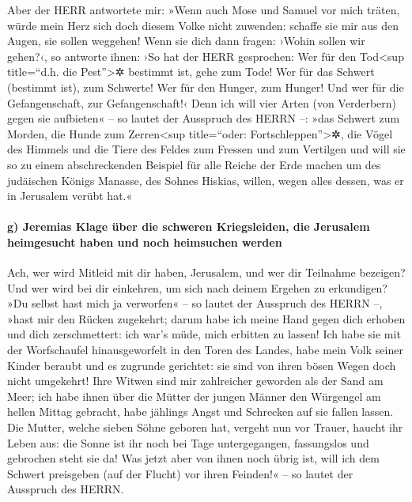 Aber der HERR antwortete mir: »Wenn auch Mose und Samuel
vor mich träten, würde mein Herz sich doch diesem Volke nicht zuwenden:
schaffe sie mir aus den Augen, sie sollen weggehen! Wenn
sie dich dann fragen: ›Wohin sollen wir gehen?‹, so antworte ihnen: ›So
hat der HERR gesprochen: Wer für den Tod\textless sup title=``d.h. die
Pest''\textgreater✲ bestimmt ist, gehe zum Tode! Wer für das Schwert
(bestimmt ist), zum Schwerte! Wer für den Hunger, zum Hunger! Und wer
für die Gefangenschaft, zur Gefangenschaft!‹ Denn ich will
vier Arten (von Verderbern) gegen sie aufbieten« -- so lautet der
Ausspruch des HERRN --: »das Schwert zum Morden, die Hunde zum
Zerren\textless sup title=``oder: Fortschleppen''\textgreater✲, die
Vögel des Himmels und die Tiere des Feldes zum Fressen und zum Vertilgen
und will sie so zu einem abschreckenden Beispiel für alle
Reiche der Erde machen um des judäischen Königs Manasse, des Sohnes
Hiskias, willen, wegen alles dessen, was er in Jerusalem verübt hat.«

\hypertarget{g-jeremias-klage-uxfcber-die-schweren-kriegsleiden-die-jerusalem-heimgesucht-haben-und-noch-heimsuchen-werden}{%
\paragraph{g) Jeremias Klage über die schweren Kriegsleiden, die
Jerusalem heimgesucht haben und noch heimsuchen
werden}\label{g-jeremias-klage-uxfcber-die-schweren-kriegsleiden-die-jerusalem-heimgesucht-haben-und-noch-heimsuchen-werden}}

Ach, wer wird Mitleid mit dir haben, Jerusalem, und wer
dir Teilnahme bezeigen? Und wer wird bei dir einkehren, um sich nach
deinem Ergehen zu erkundigen? »Du selbst hast mich ja
verworfen« -- so lautet der Ausspruch des HERRN --, »hast mir den Rücken
zugekehrt; darum habe ich meine Hand gegen dich erhoben und dich
zerschmettert: ich war's müde, mich erbitten zu lassen!
Ich habe sie mit der Worfschaufel hinausgeworfelt in den
Toren des Landes, habe mein Volk seiner Kinder beraubt und es zugrunde
gerichtet: sie sind von ihren bösen Wegen doch nicht umgekehrt!
Ihre Witwen sind mir zahlreicher geworden als der Sand am
Meer; ich habe ihnen über die Mütter der jungen Männer den Würgengel am
hellen Mittag gebracht, habe jählings Angst und Schrecken auf sie fallen
lassen. Die Mutter, welche sieben Söhne geboren hat,
vergeht nun vor Trauer, haucht ihr Leben aus: die Sonne ist ihr noch bei
Tage untergegangen, fassungslos und gebrochen steht sie da! Was jetzt
aber von ihnen noch übrig ist, will ich dem Schwert preisgeben (auf der
Flucht) vor ihren Feinden!« -- so lautet der Ausspruch des HERRN.


